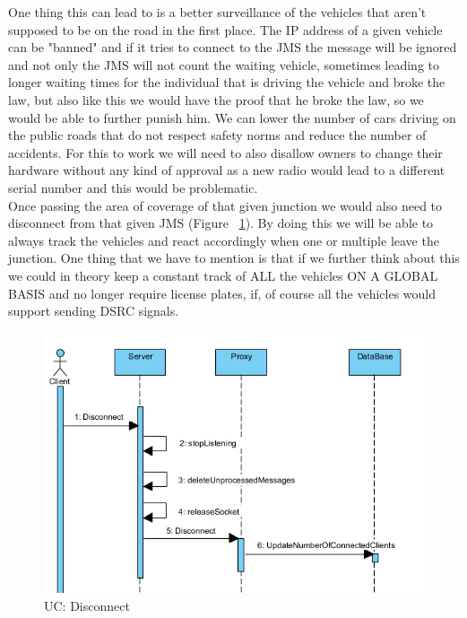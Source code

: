 \documentclass[17pt]{report}
\begin{document}
\pagebreak

One thing this can lead to is a 
better surveillance of the vehicles that aren't supposed to be on the 
road in the first place. The IP address of a given vehicle can be "banned"
and if it tries to connect to the JMS the message will be ignored
and not only the JMS will not count the waiting vehicle, sometimes 
leading to longer waiting times for the individual that is driving the
vehicle and broke the law, but also like this we would have the proof
that he broke the law, so we would be able to further punish him. We can lower the number of cars driving on the public
roads that do not respect safety norms and reduce the number of
accidents. For this to work we will need to also disallow owners to 
change their hardware without any kind of approval as a new radio
would lead to a different serial number and this would be problematic.\\
\indent \indent 
Once passing the area of coverage of that given junction we would also need
to disconnect from that given JMS (Figure ~\ref{fig:UC_Disconnect}). By doing 
this we will be able to always track the vehicles and react accordingly when
one or multiple leave the junction. One thing that we have to mention is that if
we further think about this we could in theory keep a constant track of ALL
the vehicles ON A GLOBAL BASIS and no longer require license plates, if, of 
course all the vehicles would support sending DSRC signals.  

\begin{figure}[h!]
    \includegraphics[width=\textwidth]{UC/Disconnect.png}
    \caption{UC: Disconnect}
    \label{fig:UC_Disconnect}
\end{figure}
\end{document}
